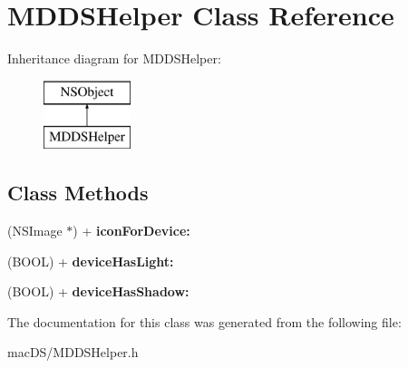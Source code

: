 \hypertarget{interface_m_d_d_s_helper}{\section{M\-D\-D\-S\-Helper Class Reference}
\label{interface_m_d_d_s_helper}
}
Inheritance diagram for M\-D\-D\-S\-Helper\-:\begin{figure}[H]
\begin{center}
\leavevmode
\includegraphics[height=2.000000cm]{interface_m_d_d_s_helper}
\end{center}
\end{figure}
\subsection*{Class Methods}
\begin{DoxyCompactItemize}
\item 
\hypertarget{interface_m_d_d_s_helper_a3f32213841f6409bca57bb0aa3d4d5c1}{(N\-S\-Image $\ast$) + {\bfseries icon\-For\-Device\-:}}\label{interface_m_d_d_s_helper_a3f32213841f6409bca57bb0aa3d4d5c1}

\item 
\hypertarget{interface_m_d_d_s_helper_a5752b28e216ca28fe5cf2fab58ff57d2}{(B\-O\-O\-L) + {\bfseries device\-Has\-Light\-:}}\label{interface_m_d_d_s_helper_a5752b28e216ca28fe5cf2fab58ff57d2}

\item 
\hypertarget{interface_m_d_d_s_helper_a6ddf62868dda17edad2a49a1fad2078c}{(B\-O\-O\-L) + {\bfseries device\-Has\-Shadow\-:}}\label{interface_m_d_d_s_helper_a6ddf62868dda17edad2a49a1fad2078c}

\end{DoxyCompactItemize}


The documentation for this class was generated from the following file\-:\begin{DoxyCompactItemize}
\item 
mac\-D\-S/M\-D\-D\-S\-Helper.\-h\end{DoxyCompactItemize}
